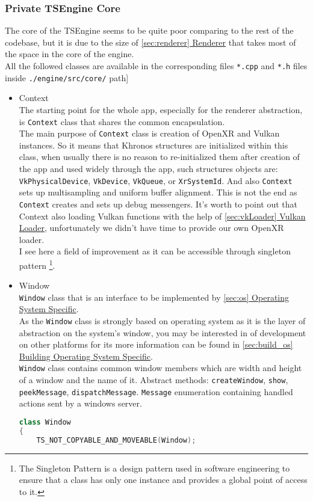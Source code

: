 \subsubsection{Private TSEngine Core}
\hspace{\parindent} The core of the TSEngine seems to be quite poor comparing to the rest of the codebase, but it is due to the size of \hyperref[sec:renderer]{\ref*{sec:renderer} Renderer} that takes most of the space in the core of the engine.\\
All the followed classes are available in the corresponding files \texttt{*.cpp} and \texttt{*.h} files inside \texttt{./engine/src/core/} path]\\
\begin{itemize}
    \item Context\\
    \label{context}
    The starting point for the whole app, especially for the renderer abstraction, is \texttt{Context} class that shares the common encapsulation.\\
    The main purpose of \texttt{Context} class is creation of OpenXR and Vulkan instances. So it means that Khronos structures are initialized within this class, when usually there is no reason to re-initialized them after creation of the app and used widely through the app, such structures objects are: \texttt{VkPhysicalDevice}, \texttt{VkDevice}, \texttt{VkQueue}, or \texttt{XrSystemId}. And also \texttt{Context} sets up multisampling and uniform buffer alignment. This is not the end as \texttt{Context} creates and sets up debug messengers.
    It's worth to point out that Context also loading Vulkan functions with the help of \hyperref[sec:vkLoader]{\ref*{sec:vkLoader} Vulkan Loader}, unfortunately we didn't have time to provide our own OpenXR loader.\\
    I see here a field of improvement as it can be accessible through singleton pattern
    \footnote{The Singleton Pattern is a design pattern used in software engineering to ensure that a class has only one instance and provides a global point of access to it.}.
    \item Window\\
    \label{window}
    \texttt{Window} class that is an interface to be implemented by \hyperref[sec:os]{\ref*{sec:os} Operating System Specific}.\\
    As the \texttt{Window} class is strongly based on operating system as it is the layer of abstraction on the system's window, you may be interested in of development on other platforms for its more information can be found in \hyperref[sec:build_os]{\ref*{sec:build_os} Building Operating System Specific}.\\
    \texttt{Window} class contains common window members which are width and height of a window and the name of it. Abstract methods: \texttt{createWindow}, \texttt{show}, \texttt{peekMessage}, \texttt{dispatchMessage}. \texttt{Message} enumeration containing handled actions sent by a windows server. 
\begin{lstlisting}[language=c++, caption=Engine window interface (./engine/src/core/window.h)]
class Window
{
    TS_NOT_COPYABLE_AND_MOVEABLE(Window);


\end{lstlisting}
\end{itemize}
